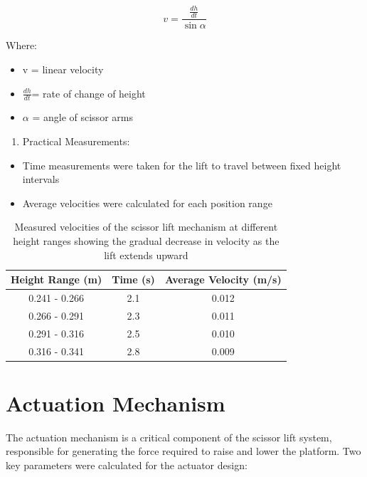 \documentclass[../../main]{subfiles}
\begin{document}
\begin{equation}
  v = \frac{\frac{dh}{dt}}{\sin \alpha}
\end{equation}

Where:

\begin{itemize}
\item
  v = linear velocity
\item
  \(\frac{dh}{dt}\)= rate of change of height
\item
  $\alpha$ = angle of scissor arms
\end{itemize}

\begin{enumerate}
\def\labelenumi{\arabic{enumi}.}
\item
  Practical Measurements:
\end{enumerate}

\begin{itemize}
\item
  Time measurements were taken for the lift to travel between fixed
  height intervals
\item
  Average velocities were calculated for each position range
\end{itemize}

\begin{table}[h!]
  \centering
  \begin{tabular}{|c|c|c|}
      \hline \rowcolor{red!20}
      \textbf{Height Range (m)} & \textbf{Time (s)} & \textbf{Average Velocity (m/s)} \\ \hline
      0.241 - 0.266 & 2.1 & 0.012 \\ \hline
      0.266 - 0.291 & 2.3 & 0.011 \\ \hline
      0.291 - 0.316 & 2.5 & 0.010 \\ \hline
      0.316 - 0.341 & 2.8 & 0.009 \\ \hline
  \end{tabular}
  \caption[Scissor Lift Velocity Measurements]{Measured velocities of the scissor lift mechanism at different height ranges showing the gradual decrease in velocity as the lift extends upward}
\end{table}

\section{Actuation Mechanism}

The actuation mechanism is a critical component of the scissor lift
system, responsible for generating the force required to raise and lower
the platform. Two key parameters were calculated for the actuator
design:
\end{document}
